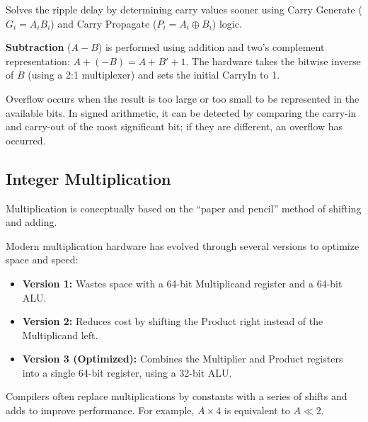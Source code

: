\begin{definition}
Solves the ripple delay by determining carry values sooner using Carry Generate ($G_i = A_i B_i$) and Carry Propagate ($P_i = A_i \oplus B_i$) logic.
\end{definition}

\begin{remark}
\textbf{Subtraction} ($A - B$) is performed using addition and two's complement representation: $A + (-B) = A + B' + 1$. The hardware takes the bitwise inverse of $B$ (using a 2:1 multiplexer) and sets the initial $\text{CarryIn}$ to 1.
\end{remark}

\begin{proposition}
Overflow occurs when the result is too large or too small to be represented in the available bits. In signed arithmetic, it can be detected by comparing the carry-in and carry-out of the most significant bit; if they are different, an overflow has occurred.
\end{proposition}

\subsection{Integer Multiplication}

Multiplication is conceptually based on the ``paper and pencil'' method of shifting and adding.

\begin{remark}
Modern multiplication hardware has evolved through several versions to optimize space and speed:
\begin{itemize}
    \item \textbf{Version 1:} Wastes space with a 64-bit Multiplicand register and a 64-bit ALU.
    \item \textbf{Version 2:} Reduces cost by shifting the Product right instead of the Multiplicand left.
    \item \textbf{Version 3 (Optimized):} Combines the Multiplier and Product registers into a single 64-bit register, using a 32-bit ALU.
\end{itemize}
\end{remark}

\begin{example}
Compilers often replace multiplications by constants with a series of shifts and adds to improve performance. For example, $A \times 4$ is equivalent to $A \ll 2$.
\end{example}

